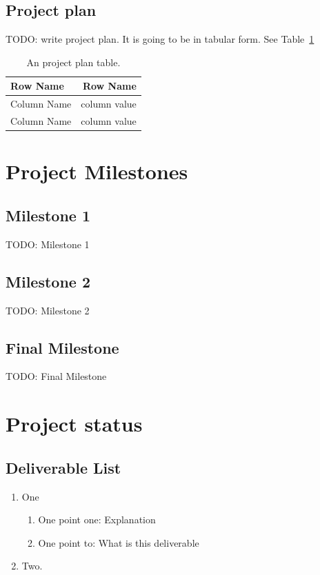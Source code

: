 \documentclass[a4paper]{article}
\begin{document}
\newpage

\subsection{Project plan}

TODO: write project plan. It is going to be in tabular form. See Table~\ref{tab:projectplan}

\begin{table}
\centering
\begin{tabular}{l|r}
Row Name & Row Name \\\hline
Column Name & column value \\
Column Name & column value
\end{tabular}
\caption{\label{tab:projectplan}An project plan table.}
\end{table}

\section{Project Milestones}
\subsection{Milestone 1}
TODO: Milestone 1
\subsection{Milestone 2}
TODO: Milestone 2
\subsection{Final Milestone}
TODO: Final Milestone

\section{Project status}
\subsection{Deliverable List}

\begin{enumerate}
\item One
  \begin{enumerate}
  \item One point one: Explanation
  \item One point to: What is this deliverable
  \end{enumerate}
\item Two.
\end{enumerate}
\end{document}
